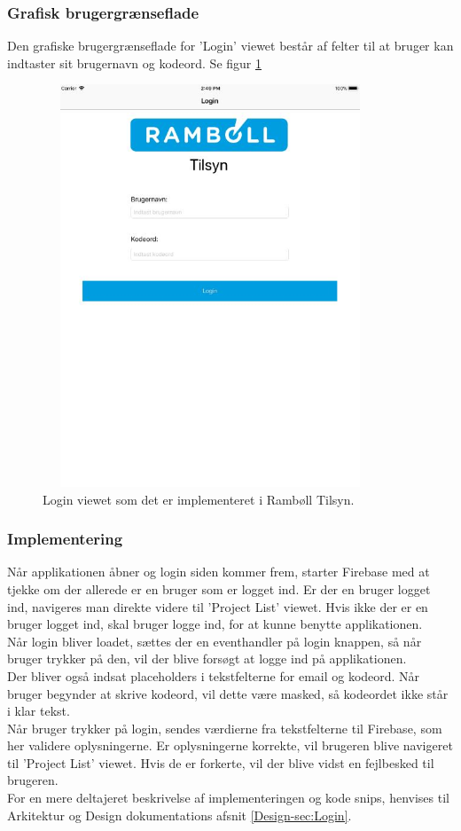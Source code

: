 \subsubsection{Grafisk brugergrænseflade}
Den grafiske brugergrænseflade for 'Login' viewet består af felter til at bruger kan indtaster sit brugernavn og kodeord. Se figur \ref{fig:LoginView}
\begin{figure}[H] %
	\centering
	\includegraphics[height=12cm, width=10cm]{Design/Applikation/Login/LoginView}
	\caption{Login viewet som det er implementeret i Rambøll Tilsyn.}
	\label{fig:LoginView}
\end{figure}

\subsubsection{Implementering}
Når applikationen åbner og login siden kommer frem, starter Firebase med at tjekke om der allerede er en bruger som er logget ind. Er der en bruger logget ind, navigeres man direkte videre til 'Project List' viewet. Hvis ikke der er en bruger logget ind, skal bruger logge ind, for at kunne benytte applikationen. \\
Når login bliver loadet, sættes der en eventhandler på login knappen, så når bruger trykker på den, vil der blive forsøgt at logge ind på applikationen. \\
Der bliver også indsat placeholders i tekstfelterne for email og kodeord. Når bruger begynder at skrive kodeord, vil dette være masked, så kodeordet ikke står i klar tekst. \\
Når bruger trykker på login, sendes værdierne fra tekstfelterne til Firebase, som her validere oplysningerne. Er oplysningerne korrekte, vil brugeren blive navigeret til 'Project List' viewet. Hvis de er forkerte, vil der blive vidst en fejlbesked til brugeren. \\
For en mere deltajeret beskrivelse af implementeringen og kode snips, henvises til Arkitektur og Design dokumentations afsnit \ref{Design-sec:Login}.

\clearpage